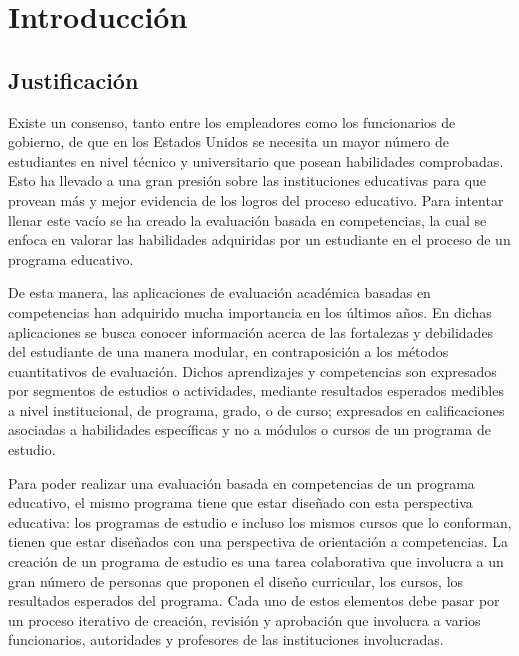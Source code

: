 \section{Introducción}

\subsection{Justificación}
Existe un consenso, tanto entre los empleadores como los funcionarios de gobierno, de que en los Estados Unidos se necesita un mayor número de estudiantes en nivel técnico y universitario que posean habilidades comprobadas\citep{kuh_knowing_2014}. Esto ha llevado a una gran presión sobre las instituciones educativas para que provean más y mejor evidencia de los logros del proceso educativo\citep{kuh_knowing_2014}. Para intentar llenar este vacío se ha creado la evaluación basada en competencias, la cual se enfoca en valorar las habilidades adquiridas por un estudiante en el proceso de un programa educativo\citep{cartwright2009student}.
 
De esta manera, las aplicaciones de evaluación académica basadas en competencias han adquirido mucha importancia en los últimos años\citep{barrio_minton_evaluating_2016}. En dichas aplicaciones se busca conocer información acerca de las fortalezas y debilidades del estudiante de una manera modular, en contraposición a los métodos cuantitativos de evaluación. Dichos aprendizajes y competencias son expresados por segmentos de estudios o actividades, mediante resultados esperados medibles a nivel institucional, de programa, grado, o de curso; expresados en calificaciones asociadas a habilidades específicas y no a módulos o cursos de un programa de estudio\citep{kuh_using_2015}. 
 
Para poder realizar una evaluación basada en competencias de un programa educativo, el mismo programa tiene que estar diseñado con esta perspectiva educativa: los programas de estudio e incluso los mismos cursos que lo conforman, tienen que estar diseñados con una perspectiva de orientación a competencias\citep{lalor_ensuring_2017}. La creación de un programa de estudio es una tarea colaborativa que involucra a un gran número de personas que proponen el diseño curricular, los cursos, los resultados esperados del programa. Cada uno de estos elementos debe pasar por un proceso iterativo de creación, revisión y aprobación que involucra a varios funcionarios, autoridades y profesores de las instituciones involucradas\citep{boyle_curriculum_2016}. 
 
